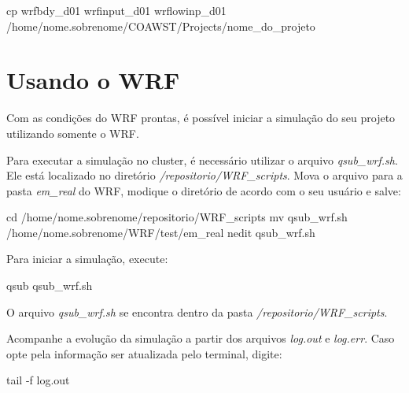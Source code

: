 \begin{bashcode}[fontsize=\scriptsize]
cp wrfbdy_d01 wrfinput_d01 wrflowinp_d01 /home/nome.sobrenome/COAWST/Projects/nome_do_projeto
\end{bashcode}
\bigskip

\section{Usando o WRF}
\bigskip

\noindent Com as condições do WRF prontas, é possível iniciar a simulação do seu projeto utilizando somente o WRF.
\bigskip

\noindent Para executar a simulação no cluster, é necessário utilizar o arquivo \textit{qsub\_wrf.sh}. Ele está localizado no diretório \textit{/repositorio/WRF\_scripts}. Mova o arquivo para a pasta \textit{em\_real} do WRF, modique o diretório de acordo com o seu usuário e salve:
\bigskip

\begin{bashcode}
cd /home/nome.sobrenome/repositorio/WRF_scripts
mv qsub_wrf.sh /home/nome.sobrenome/WRF/test/em_real
nedit qsub_wrf.sh
\end{bashcode}
\bigskip

\noindent Para iniciar a simulação, execute:
\bigskip

\begin{bashcode}
qsub qsub_wrf.sh
\end{bashcode}
\bigskip

\begin{tcolorbox}[enhanced,
  grow to left by=0cm,%
  grow to right by=0cm,%
  enlarge top by=0cm,%
  enlarge bottom by=0cm,%
  tcbox raise base,
  boxrule=1.0pt,
  left=18mm,
  colframe=red!50!black,coltext=red!25!black,colback=red!10!white,
  overlay={\begin{tcbclipinterior}\fill[red!75!blue!50!white] (frame.south west)
    rectangle node[text=white,font=\sffamily\bfseries\footnotesize,rotate=0] {ATENÇÃO} ([xshift=18mm]frame.north west);\end{tcbclipinterior}}]
O arquivo \textit{qsub\_wrf.sh} se encontra dentro da pasta \textit{/repositorio/WRF\_scripts}.
\end{tcolorbox}
\bigskip

\noindent Acompanhe a evolução da simulação a partir dos arquivos \textit{log.out} e \textit{log.err}. Caso opte pela informação ser atualizada pelo terminal, digite:
\bigskip

\begin{bashcode}
tail -f log.out
\end{bashcode}
\bigskip
